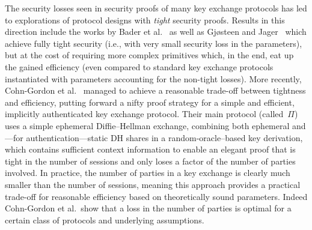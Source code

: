 The security losses seen in security proofs of many key exchange protocols has led to explorations of protocol designs with \emph{tight} security proofs.
Results in this direction include the works by Bader et al.~\cite{TCC:BHJKL15} as well as Gj\o{}steen and Jager~\cite{C:GjoJag18} which achieve fully tight security (i.e., with very small security loss in the parameters),
but at the cost of requiring more complex primitives which, in the end, eat up the gained efficiency (even compared to standard key exchange protocols instantiated with parameters accounting for the non-tight losses).
More recently, Cohn-Gordon et al.~\cite{C:CCGJJ19,EPRINT:CCGJJ19} managed to achieve a reasonable trade-off between tightness and efficiency,
putting forward a nifty proof strategy for a simple and efficient, implicitly authenticated key exchange protocol.
Their main protocol (called~$\Pi$) uses a simple ephemeral Diffie--Hellman exchange, combining both ephemeral and---for authentication---static DH shares in a random-oracle--based key derivation, which contains sufficient context information to enable an elegant proof that is tight in the number of sessions and only loses a factor of the number of parties involved.
In practice, the number of parties in a key exchange is clearly much smaller than the number of sessions, meaning this approach provides a practical trade-off for reasonable efficiency based on theoretically sound parameters.
Indeed Cohn-Gordon et al.\ show that a loss in the number of parties is optimal for a certain class of protocols and underlying assumptions.

